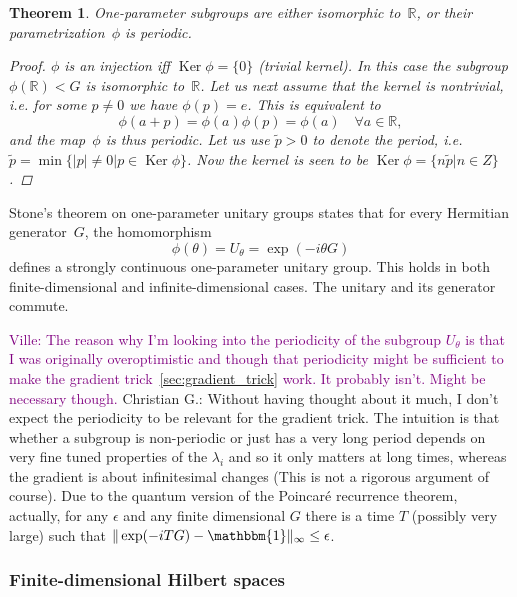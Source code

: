 \documentclass[aps,pra,10pt,twocolumn,groupedaddress,nofootinbib]{revtex4-1}
\theoremstyle{plain}
\newtheorem{theorem}{Theorem}%
\DeclareMathOperator{\Ker}{Ker}    %
\newcommand{\be}{\begin{equation}}
\newcommand{\ee}{\end{equation}}
\newcommand{\R}{\ensuremath{\mathbb R}}  %
\newcommand{\I}{\mathbbm{1}} %
\newcommand{\ville}[1]{\textcolor{purple}{Ville: #1}}
\newcommand{\cg}[1]{\textcolor{cyan!80!black}{Christian G.: #1}}
\begin{document}
\begin{theorem}
  \label{th:1psg}
One-parameter subgroups are either isomorphic to~$\R$, or their parametrization~$\phi$ is periodic.

\begin{proof}
$\phi$ is an injection iff $\Ker \phi = \{0\}$ (trivial kernel).
In this case the subgroup $\phi(\R) < G$ is isomorphic to~$\R$.
Let us next assume that the kernel is nontrivial, i.e. for some $p \neq 0$ we have
$\phi(p) = e$.
This is equivalent to
\be
\phi(a+p) = \phi(a)\phi(p) = \phi(a) \quad \forall a \in \R,
\ee
and the map~$\phi$ is thus periodic. Let us use $\tilde{p}>0$
to denote the period, i.e.
$\tilde{p} = \min \{|p| \neq 0 | p \in \Ker \phi\}$.
Now the kernel is seen to be $\Ker \phi = \{n \tilde{p} | n \in Z\}$.
\end{proof}
\end{theorem}

Stone's theorem on one-parameter unitary groups states that
for every Hermitian generator~$G$, the homomorphism
\be
\label{eq:1pug}
\phi(\theta) = U_\theta = \exp(-i \theta G)
\ee
defines a strongly continuous one-parameter unitary group.
This holds in both finite-dimensional and infinite-dimensional cases.
The unitary and its generator commute.

\ville{The reason why I'm looking into the periodicity of the subgroup $U_\theta$ is that I was originally
  overoptimistic and though that periodicity might be sufficient to make the gradient trick~\ref{sec:gradient_trick} work. It probably isn't.
  Might be necessary though.}
\cg{Without having thought about it much, I don't expect the periodicity to be relevant for the gradient trick. The intuition is that whether a subgroup is non-periodic or just has a very long period depends on very fine tuned properties of the $\lambda_i$ and so it only matters at long times, whereas the gradient is about infinitesimal changes (This is not a rigorous argument of course). Due to the quantum version of the Poincar\'{e} recurrence theorem, actually, for any $\epsilon$ and any finite dimensional $G$ there is a time $T$ (possibly very large) such that $\|\exp(-i T G) - \I \|_\infty \leq \epsilon$.}

\subsubsection{Finite-dimensional Hilbert spaces}
\end{document}
